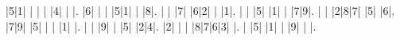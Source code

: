 \begin{sudoku-block}|5|1| | | | |4| | |.
|6| | | |5|1| | |8|.
| | |7| |6|2| | |1|.
| | |5| |1| | |7|9|.
| | |2|8|7| |5| |6|.
|7|9| |5| | | |1| |.
| | |9| | |5| |2|4|.
|2| | | |8|7|6|3| |.
| |5| |1| | |9| | |.
\end{sudoku-block}